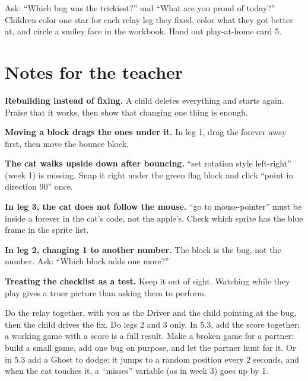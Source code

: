 \begin{reflection}
Ask: \enquote{Which bug was the trickiest?} and \enquote{What are you proud of today?} Children color one star for each relay leg they fixed, color what they got better at, and circle a smiley face in the workbook. Hand out play-at-home card 5.
\end{reflection}

\section{Notes for the teacher}
\begin{commonmistakes}
  \item \textbf{Rebuilding instead of fixing.} A child deletes everything and starts again. Praise that it works, then show that changing one thing is enough.
  \item \textbf{Moving a block drags the ones under it.} In leg 1, drag the forever away first, then move the bounce block.
  \item \textbf{The cat walks upside down after bouncing.} \enquote{set rotation style left-right} (week 1) is missing. Snap it right under the green flag block and click \enquote{point in direction 90} once.
  \item \textbf{In leg 3, the cat does not follow the mouse.} \enquote{go to mouse-pointer} must be inside a forever in the cat's code, not the apple's. Check which sprite has the blue frame in the sprite list.
  \item \textbf{In leg 2, changing 1 to another number.} The block is the bug, not the number. Ask: \enquote{Which block adds one more?}
  \item \textbf{Treating the checklist as a test.} Keep it out of sight. Watching while they play gives a truer picture than asking them to perform.
\end{commonmistakes}

\begin{differentiation}
\supportpath Do the relay together, with you as the Driver and the child pointing at the bug, then the child drives the fix. Do legs 2 and 3 only. In 5.3, add the score together; a working game with a score is a full result.
\extensionpath Make a broken game for a partner: build a small game, add one bug on purpose, and let the partner hunt for it. Or in 5.3 add a Ghost to dodge: it jumps to a random position every 2 seconds, and when the cat touches it, a \enquote{misses} variable (as in week 3) goes up by 1.
\end{differentiation}

